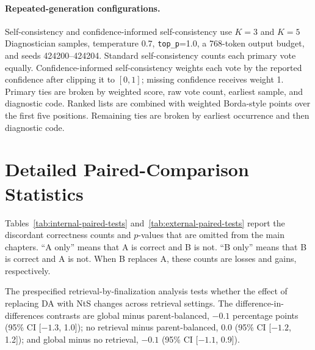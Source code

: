 \documentclass[12pt,a4paper,oneside]{report}
\begin{document}
\paragraph{Repeated-generation configurations.}
Self-consistency and confidence-informed self-consistency use $K=3$ and $K=5$ Diagnostician samples, temperature 0.7, \texttt{top\_p}=1.0, a 768-token output budget, and seeds 424200--424204. Standard self-consistency counts each primary vote equally. Confidence-informed self-consistency weights each vote by the reported confidence after clipping it to $[0,1]$; missing confidence receives weight 1. Primary ties are broken by weighted score, raw vote count, earliest sample, and diagnostic code. Ranked lists are combined with weighted Borda-style points over the first five positions. Remaining ties are broken by earliest occurrence and then diagnostic code.

\section{Detailed Paired-Comparison Statistics}

Tables~\ref{tab:internal-paired-tests} and~\ref{tab:external-paired-tests} report the discordant correctness counts and $p$-values that are omitted from the main chapters. ``A only'' means that A is correct and B is not. ``B only'' means that B is correct and A is not. When B replaces A, these counts are losses and gains, respectively.

\noindent\begin{minipage}{\textwidth}
The prespecified retrieval-by-finalization analysis tests whether the effect of replacing DA with NtS changes across retrieval settings. The difference-in-differences contrasts are global minus parent-balanced, $-0.1$ percentage points (95\% CI [$-1.3$, 1.0]); no retrieval minus parent-balanced, 0.0 (95\% CI [$-1.2$, 1.2]); and global minus no retrieval, $-0.1$ (95\% CI [$-1.1$, 0.9]).
\end{minipage}
\end{document}
